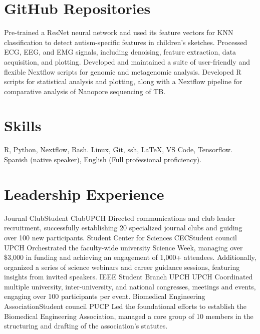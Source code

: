 \documentclass[11pt,a4paper,sans]{moderncv}
\begin{document}
\section{GitHub Repositories}
    {Pre-trained a ResNet neural network and used its feature vectors for KNN classification to detect autism-specific features in children's sketches.}{}{}
    {}
    {Processed ECG, EEG, and EMG signals, including denoising, feature extraction, data acquisition, and plotting.  }{}{}
    {}
    {Developed and maintained a suite of user-friendly and flexible Nextflow scripts for genomic and metagenomic analysis.}{}{}
    {}
    {Developed R scripts for statistical analysis and plotting, along with a Nextflow pipeline for comparative analysis of Nanopore sequencing of TB.}{}{}
    {}

\section{Skills}
  {}{}{R, Python, Nextflow, Bash.}
  {}
  {}{Linux, Git, ssh, LaTeX, VS Code, Tensorflow.}{}
  {}
  {}{Spanish (native speaker), English (Full professional proficiency).}
  {}
  {}

\section{Leadership Experience}
  {Journal Club}{Student Club}{UPCH}
  {Directed communications and club leader recruitment, successfully establishing 20 specialized journal clubs and guiding over 100 new participants.
  }
  {Student Center for Sciences CEC}{Student council}
  {UPCH}
  {Orchestrated the faculty-wide university Science Week, managing over \$3,000 in funding and achieving an engagement of 1,000+ attendees. Additionally, organized a series of science webinars and career guidance sessions, featuring insights from invited speakers. 
  }
  {IEEE Student Branch UPCH}{}
  {UPCH}
  {Coordinated multiple university, inter-university, and national congresses, meetings and events, engaging over 100 participants per event.
  }
  {Biomedical Engineering Association}{Student council}
  {PUCP}
  {Led the foundational efforts to establish the Biomedical Engineering Association, managed a core group of 10 members in the structuring and drafting of the association’s statutes.
  }
\end{document}
